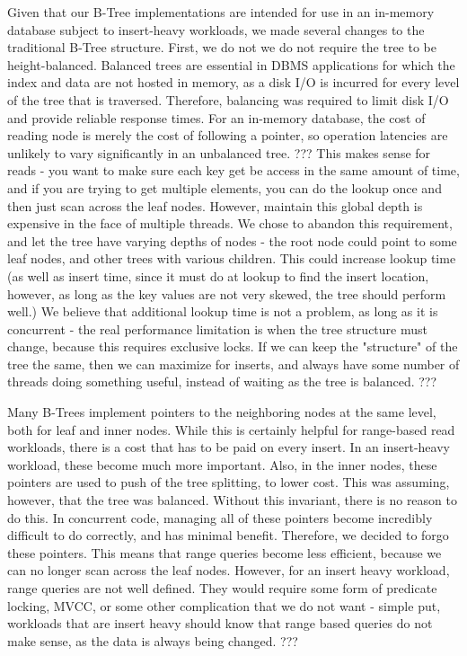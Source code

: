 \documentclass{sig-alternate}
\begin{document}
Given that our B-Tree implementations are intended for use in an in-memory database subject to insert-heavy workloads, we made several changes to the traditional B-Tree structure.  First, we do not we do not require the tree to be height-balanced.  Balanced trees are essential in DBMS applications for which the index and data are not hosted in memory, as a disk I/O is incurred for every level of the tree that is traversed. Therefore, balancing was required to limit disk I/O and provide reliable response times. For an in-memory database, the cost of reading node is merely the cost of following a pointer, so operation latencies are unlikely to vary significantly in an unbalanced tree. 
???
This makes sense for reads - you want to make sure each key get be access in the same amount of time, and if you are trying to get multiple elements, you can do the lookup once and then just scan across the leaf nodes.  However, maintain this global depth is expensive in the face of multiple threads.  We chose to abandon this requirement, and let the tree have varying depths of nodes - the root node could point to some leaf nodes, and other trees with various children.  This could increase lookup time (as well as insert time, since it must do at lookup to find the insert location, however, as long as the key values are not very skewed, the tree should perform well.)  We believe that additional lookup time is not a problem, as long as it is concurrent - the real performance limitation is when the tree structure must change, because this requires exclusive locks.  If we can keep the "structure" of the tree the same, then we can maximize for inserts, and always have some number of threads doing something useful, instead of waiting as the tree is balanced.
???

Many B-Trees implement pointers to the neighboring nodes at the same level, both for leaf and inner nodes.  While this is certainly helpful for range-based read workloads, there is a cost that has to be paid on every insert.  In an insert-heavy workload, these become much more important.  Also, in the inner nodes, these pointers are used to push of the tree splitting, to lower cost.  This was assuming, however, that the tree was balanced.  Without this invariant, there is no reason to do this.  In concurrent code, managing all of these pointers become incredibly difficult to do correctly, and has minimal benefit.  Therefore, we decided to forgo these pointers.  This means that range queries become less efficient, because we can no longer scan across the leaf nodes.  However, for an insert heavy workload, range queries are not well defined.  They would require some form of predicate locking, MVCC, or some other complication that we do not want - simple put, workloads that are insert heavy should know that range based queries do not make sense, as the data is always being changed.
???
\end{document}
